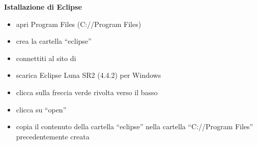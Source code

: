 \documentclass{article}
\begin{document}
\textbf{Istallazione di Eclipse}
\begin{itemize}
\item apri Program Files (C://Program Files)
\item crea la cartella ``eclipse''
\item connettiti al sito di \href{https://eclipse.org/downloads/}{}
\item scarica Eclipse Luna SR2 (4.4.2) per Windows
\item clicca sulla freccia verde rivolta verso il basso
\item clicca su ``open''
\item copia il contenuto della cartella ``eclipse'' nella cartella ``C://Program Files'' precedentemente creata
\end{itemize}
\end{document}
